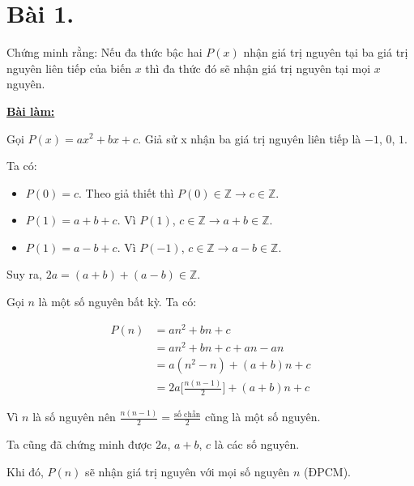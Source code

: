 \section*{Bài 1.}

Chứng minh rằng: Nếu đa thức bậc hai $P(x)$ nhận giá trị nguyên tại ba giá trị  nguyên liên tiếp của biến $x$ thì đa thức đó sẽ nhận giá trị nguyên tại mọi $x$ nguyên.

\begin{center}
    \textbf{\underline{Bài làm:}}
\end{center}


Gọi $P(x) = ax^2 + bx + c$. Giả sử x nhận ba giá trị nguyên liên tiếp là $-1$, $0$, $1$.

Ta có:
\begin{itemize}
    \item $P(0) = c$. Theo giả thiết thì $P(0) \in \mathbb{Z} \rightarrow c \in \mathbb{Z}$.
    \item $P(1) = a + b + c$. Vì $P(1)$, $c \in \mathbb{Z} \rightarrow a + b \in \mathbb{Z}$.
    \item $P(1) = a - b + c$. Vì $P(-1)$, $c \in \mathbb{Z} \rightarrow a - b \in \mathbb{Z}$.
\end{itemize}

Suy ra, $2a = (a + b) + (a - b) \in \mathbb{Z}$.

Gọi $n$ là một số nguyên bất kỳ. Ta có:

\begin{align*}
    P(n) &= an^2 + bn + c \\
    &= an^2 + bn + c + an - an \\
    &= a(n^2 - n) + (a + b)n + c \\
    &= 2a \big[ \frac{n(n-1)}{2} \big] + (a + b)n + c
\end{align*}

Vì $n$ là số nguyên nên $\displaystyle \frac{n(n-1)}{2} = \frac{\text{số chẵn}}{2}$ cũng là một số nguyên.

Ta cũng đã chứng minh được $2a$, $a + b$, $c$ là các số nguyên.

Khi đó, $P(n)$ sẽ nhận giá trị nguyên với mọi số nguyên $n$ (ĐPCM).

\clearpage